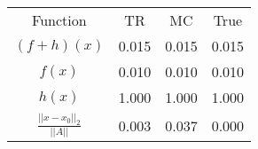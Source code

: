 \begin{tabular}{| c |c |c |c |}
    \hline
    \rowcolor[gray]{0.9}
\multicolumn{4}{|c|}{Minima} \\ \hline Function & TR & MC & True \\
    \hline
  \rowcolor[gray]{0.7}
    $ (f + h)(x) $ & 0.015 & 0.015 & 0.015 \\
  \hline
  \rowcolor[gray]{0.8}
    $ f(x) $ & 0.010 & 0.010 & 0.010 \\
  \hline
  \rowcolor[gray]{0.7}
    $ h(x) $ & 1.000 & 1.000 & 1.000 \\
  \hline
  \rowcolor[gray]{0.8}
    $ \frac{||x - x_0||_2}{||A||} $ & 0.003 & 0.037 & 0.000 \\
  \hline
\end{tabular}
